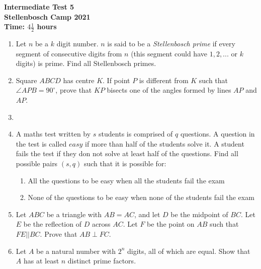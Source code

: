 \documentclass{article}
\begin{document}
\thispagestyle{empty}

\begin{center}
  \textbf{\Large Intermediate Test 5}
  \\ \vspace{1em}
  \textbf{\large Stellenbosch Camp 2021}
  \\ \vspace{1em}
  \textbf{\large Time: $4\frac{1}{2}$ hours}
\end{center}

\bigskip

\begin{enumerate}[itemsep=\fill]

\item %
Let $n$ be a $k$ digit number. $n$ is said to be a \textit{Stellenbosch prime} if every segment of consecutive digits from $n$ (this segment could have $1,2,...$ or $k$ digits) is prime. Find all Stellenbosch primes.


\item %
Square $ABCD$ has centre $K$. If point $P$ is different from $K$ such that $\angle APB = 90^{\circ}$, prove that $KP$ bisects one of the angles formed by lines $AP$ and $AP$.

\item %


\item %
A maths test written by $s$ students is comprised of $q$ questions. A question in the test is called $easy$ if more than half of the students solve it. A student fails the test if they don not solve at least half of the questions. Find all possible pairs $(s, q)$ such that it is possible for:
\begin{enumerate}
\item All the questions to be easy when all the students fail the exam
\item None of the questions to be easy when none of the students fail the exam 
\end{enumerate}

\item %
Let $ABC$ be a triangle with $AB=AC$, and let $D$ be the midpoint of $BC$. Let $E$ be the reflection of $D$ across $AC$. Let $F$ be the point on $AB$ such that $FE||BC$. Prove that $AB\perp FC$.


\item %
Let $A$ be a natural number with $2^n$ digits, all of which are equal. Show that $A$ has at least $n$ distinct prime factors.

\end{enumerate}
\end{document}
